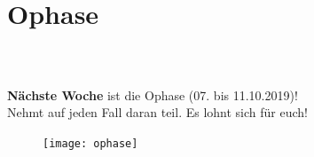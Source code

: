 \section{Ophase}
\begin{frame}
	\frametitle{\insertsectionhead \\ {\small \insertsubsectionhead}}
	\textbf{Nächste Woche} ist die Ophase (07. bis 11.10.2019)! \\
	Nehmt auf jeden Fall daran teil. Es lohnt sich für euch!
	\begin{figure}
		\centering
		\texttt{[image: ophase]}
	\end{figure}
\end{frame}


